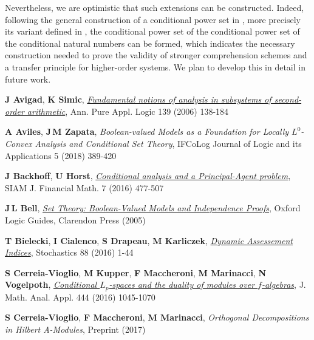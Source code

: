 \documentclass{jloganal}
\numberwithin{equation}{section}
\theoremstyle{plain}
\begin{document}
Nevertheless, we are optimistic that such extensions can be constructed. Indeed, following the general construction of a conditional 	power set in \cite{drapeau2016algebra}, more precisely its variant defined in \cite{jamneshan2017measures}, the conditional power set of the conditional power set of the conditional natural 
numbers can be formed, which indicates the necessary construction needed to prove the validity of stronger comprehension schemes and  a transfer principle for higher-order systems.
We plan to develop this in detail in future work.

\begin{thebibliography}{}
\providecommand\bibmarginpar{\leavevmode\marginpar}
\def\urlstyle#1{{\tt #1}}

\textbf{J Avigad}, \textbf{K Simic},
  \href{http://dx.doi.org/10.1016/j.apal.2005.03.004} {\emph{{Fundamental
  notions of analysis in subsystems of second-order arithmetic}}}, Ann. Pure Appl. Logic 139 (2006) 138-184

\textbf{A Aviles}, \textbf{J\,M Zapata}, \emph{{Boolean-valued Models as a
  Foundation for Locally $L^0$-Convex Analysis and Conditional Set Theory}},
  IFCoLog Journal of Logic and its Applications 5 (2018) 389-420

\textbf{J Backhoff}, \textbf{U Horst},
  \href{http://dx.doi.org/10.1137/14100066X} {\emph{{Conditional analysis and a Principal-Agent problem}}}, SIAM J. Financial Math. 7 (2016) 477-507

\textbf{J\,L Bell}, \href{http://dx.doi.org/10.2307/2273926} {\emph{Set Theory: Boolean-Valued Models and Independence Proofs}}, Oxford Logic Guides, Clarendon Press (2005)

\textbf{T Bielecki}, \textbf{I Cialenco}, \textbf{S Drapeau}, \textbf{M
  Karliczek}, \href{http://dx.doi.org/10.1080/17442508.2015.1026346}
  {\emph{{Dynamic Assessement Indices}}}, Stochastics 88 (2016) 1-44

\textbf{S Cerreia-Vioglio}, \textbf{M Kupper}, \textbf{F Maccheroni}, \textbf{M Marinacci}, \textbf{N Vogelpoth},
  \href{http://dx.doi.org/10.1016/j.jmaa.2016.06.018} {\emph{{Conditional
  $L_p$-spaces and the duality of modules over $f$-algebras}}}, J. Math. Anal. Appl. 444 (2016) 1045-1070

\textbf{S Cerreia-Vioglio}, \textbf{F Maccheroni}, \textbf{M Marinacci},
  \emph{{Orthogonal Decompositions in Hilbert A-Modules}}, Preprint  (2017)


\end{thebibliography}
\end{document}
